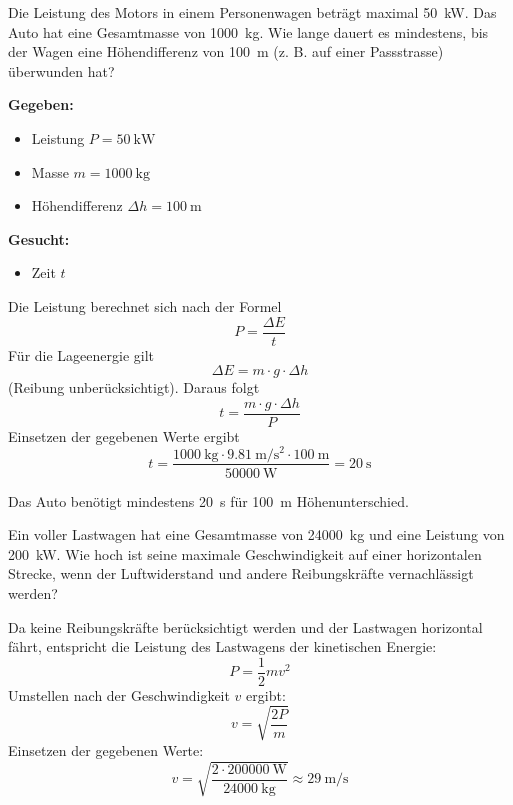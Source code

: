 \begin{questions}

\question
Die Leistung des Motors in einem Personenwagen beträgt maximal \SI{50}{\kilo\watt}. Das Auto hat eine Gesamtmasse von \SI{1000}{\kilo\gram}. Wie lange dauert es mindestens, bis der Wagen eine Höhendifferenz von \SI{100}{\meter} (z. B. auf einer Passstrasse) überwunden hat?

\begin{solution}

\textbf{Gegeben:}
\begin{itemize}
    \item Leistung $P = \SI{50}{\kilo\watt}$
    \item Masse $m = \SI{1000}{\kilo\gram}$
    \item Höhendifferenz $\Delta h = \SI{100}{\meter}$
\end{itemize}

\textbf{Gesucht:}
\begin{itemize}
    \item Zeit $t$
\end{itemize}

Die Leistung berechnet sich nach der Formel 
\[ P = \frac{\Delta E}{t} \]
Für die Lageenergie gilt 
\[ \Delta E = m \cdot g \cdot \Delta h \]
(Reibung unberücksichtigt). Daraus folgt
\[ t = \frac{m \cdot g \cdot \Delta h}{P} \]
Einsetzen der gegebenen Werte ergibt
\[ t = \frac{\SI{1000}{\kilo\gram} \cdot \SI{9.81}{\meter\per\second\squared} \cdot \SI{100}{\meter}}{\SI{50000}{\watt}} = \SI{20}{\second} \]

Das Auto benötigt mindestens \SI{20}{\second} für \SI{100}{\meter} Höhenunterschied.

\end{solution}


\question
Ein voller Lastwagen hat eine Gesamtmasse von \SI{24000}{\kilo\gram} und eine Leistung von \SI{200}{\kilo\watt}. Wie hoch ist seine maximale Geschwindigkeit auf einer horizontalen Strecke, wenn der Luftwiderstand und andere Reibungskräfte vernachlässigt werden?

\begin{solution}
Da keine Reibungskräfte berücksichtigt werden und der Lastwagen horizontal fährt, entspricht die Leistung des Lastwagens der kinetischen Energie:
\[ P = \frac{1}{2} m v^2 \]
Umstellen nach der Geschwindigkeit \( v \) ergibt:
\[ v = \sqrt{\frac{2P}{m}} \]
Einsetzen der gegebenen Werte:
\[ v = \sqrt{\frac{2 \cdot \SI{200000}{\watt}}{\SI{24000}{\kilo\gram}}} \approx \SI{29}{\meter\per\second} \]
\end{solution}


\end{questions}
